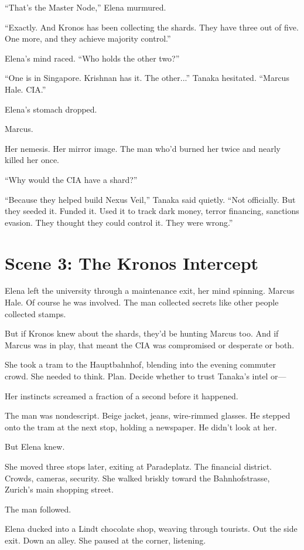 \documentclass[12pt,oneside]{book}
\begin{document}
``That's the Master Node,'' Elena murmured.

``Exactly. And Kronos has been collecting the shards. They have three out of five. One more, and they achieve majority control.''

Elena's mind raced. ``Who holds the other two?''

``One is in Singapore. Krishnan has it. The other...'' Tanaka hesitated. ``Marcus Hale. CIA.''

Elena's stomach dropped.

Marcus.

Her nemesis. Her mirror image. The man who'd burned her twice and nearly killed her once.

``Why would the CIA have a shard?''

``Because they helped build Nexus Veil,'' Tanaka said quietly. ``Not officially. But they seeded it. Funded it. Used it to track dark money, terror financing, sanctions evasion. They thought they could control it. They were wrong.''

\section*{Scene 3: The Kronos Intercept}

Elena left the university through a maintenance exit, her mind spinning. Marcus Hale. Of course he was involved. The man collected secrets like other people collected stamps.

But if Kronos knew about the shards, they'd be hunting Marcus too. And if Marcus was in play, that meant the CIA was compromised or desperate or both.

She took a tram to the Hauptbahnhof, blending into the evening commuter crowd. She needed to think. Plan. Decide whether to trust Tanaka's intel or—

Her instincts screamed a fraction of a second before it happened.

The man was nondescript. Beige jacket, jeans, wire-rimmed glasses. He stepped onto the tram at the next stop, holding a newspaper. He didn't look at her.

But Elena knew.

She moved three stops later, exiting at Paradeplatz. The financial district. Crowds, cameras, security. She walked briskly toward the Bahnhofstrasse, Zurich's main shopping street.

The man followed.

Elena ducked into a Lindt chocolate shop, weaving through tourists. Out the side exit. Down an alley. She paused at the corner, listening.
\end{document}
